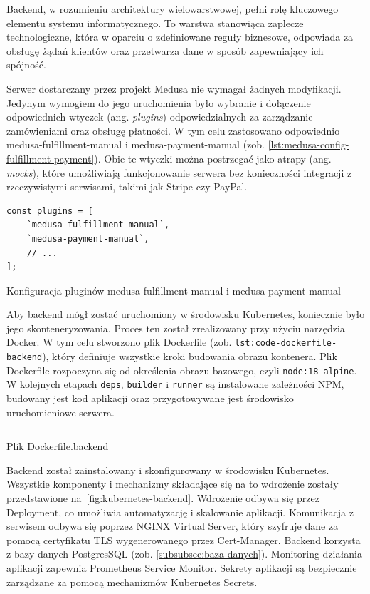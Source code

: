 Backend, w rozumieniu architektury wielowarstwowej, pełni rolę kluczowego elementu systemu informatycznego.
To warstwa stanowiąca zaplecze technologiczne, która w oparciu o zdefiniowane reguły biznesowe, odpowiada za obsługę żądań klientów oraz przetwarza dane w sposób zapewniający ich spójność.

Serwer dostarczany przez projekt Medusa nie wymagał żadnych modyfikacji.
Jedynym wymogiem do jego uruchomienia było wybranie i dołączenie odpowiednich wtyczek (ang. \emph{plugins}) odpowiedzialnych za zarządzanie zamówieniami oraz obsługę płatności.
W tym celu zastosowano odpowiednio medusa-fulfillment-manual i medusa-payment-manual (zob. \autoref{lst:medusa-config-fulfillment-payment}).
Obie te wtyczki można postrzegać jako atrapy (ang. \emph{mocks}), które umożliwiają funkcjonowanie serwera bez konieczności integracji z rzeczywistymi serwisami, takimi jak Stripe czy PayPal.

\begin{listing}[H]
    \begin{verbatim}
const plugins = [
    `medusa-fulfillment-manual`,
    `medusa-payment-manual`,
    // ...
];
    \end{verbatim}
    \caption{Konfiguracja pluginów medusa-fulfillment-manual i medusa-payment-manual}
    \label{lst:medusa-config-fulfillment-payment}
\end{listing}

Aby backend mógł zostać uruchomiony w środowisku Kubernetes, koniecznie było jego skonteneryzowania.
Proces ten został zrealizowany przy użyciu narzędzia Docker.
W tym celu stworzono plik Dockerfile (zob. \texttt{lst:code-dockerfile-backend}), który definiuje wszystkie kroki budowania obrazu kontenera.
Plik Dockerfile rozpoczyna się od określenia obrazu bazowego, czyli \texttt{node:18-alpine}.
W kolejnych etapach \texttt{deps}, \texttt{builder} i \texttt{runner} są instalowane zależności NPM, budowany jest kod aplikacji oraz przygotowywane jest środowisko uruchomieniowe serwera.

\begin{listing}[H]
    \inputminted[xleftmargin=20pt,linenos]{docker}{code/Dockerfile.backend}
    \caption{Plik Dockerfile.backend}
    \label{lst:code-dockerfile-backend}
\end{listing}

Backend został zainstalowany i skonfigurowany w środowisku Kubernetes.
Wszystkie komponenty i mechanizmy składające się na to wdrożenie zostały przedstawione na~\autoref{fig:kubernetes-backend}.
Wdrożenie odbywa się przez Deployment, co umożliwia automatyzację i skalowanie aplikacji.
Komunikacja z serwisem odbywa się poprzez NGINX Virtual Server, który szyfruje dane za pomocą certyfikatu TLS wygenerowanego przez Cert-Manager.
Backend korzysta z bazy danych PostgresSQL (zob. \autoref{subsubsec:baza-danych}).
Monitoring działania aplikacji zapewnia Prometheus Service Monitor.
Sekrety aplikacji są bezpiecznie zarządzane za pomocą mechanizmów Kubernetes Secrets.

